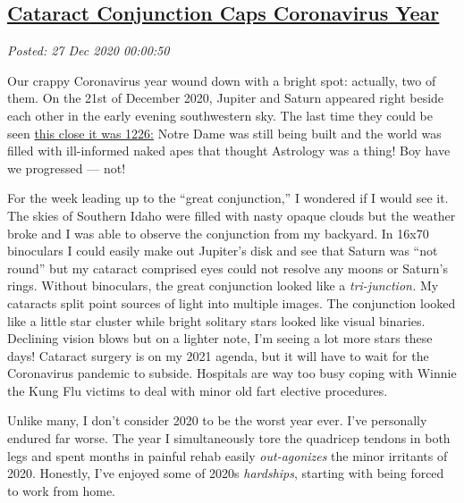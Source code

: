 %

\subsection*{\href{http://analyzethedatanotthedrivel.org/2020/12/26/cataract-conjunction-caps-coronavirus-year/}{Cataract Conjunction Caps Coronavirus Year}}


\noindent\emph{Posted: 27 Dec 2020 00:00:50}
\vspace{6pt}

Our crappy Coronavirus year wound down with a bright spot: actually, two
of them. On the 21st of December 2020, Jupiter and Saturn appeared right
beside each other in the early evening southwestern sky. The last time
they could be seen
\href{https://astronomy.com/news/2020/12/jupiter-and-saturn-will-form-rare-christmas-star-on-winter-solstice}{this
close it was 1226:} Notre Dame was still being built and the world was
filled with ill-informed naked apes that thought Astrology was a thing!
Boy have we progressed --- not!

For the week leading up to the ``great conjunction,'' I wondered if I
would see it. The skies of Southern Idaho were filled with nasty opaque
clouds but the weather broke and I was able to observe the conjunction
from my backyard. In 16x70 binoculars I could easily make out Jupiter's
disk and see that Saturn was ``not round'' but my cataract
comprised eyes could not resolve any moons or Saturn's rings. Without
binoculars, the great conjunction looked like a \emph{tri-junction.} My
cataracts split point sources of light into multiple images. The
conjunction looked like a little star cluster while bright solitary
stars looked like visual binaries. Declining vision blows but on a
lighter note, I'm seeing a lot more stars these days! Cataract surgery
is on my 2021 agenda, but it will have to wait for the Coronavirus
pandemic to subside. Hospitals are way too busy coping with Winnie the
Kung Flu victims to deal with minor old fart elective procedures.

Unlike many, I don't consider 2020 to be the worst year ever. I've
personally endured far worse. The year I simultaneously tore the
quadricep tendons in both legs and spent months in painful rehab easily
\emph{out-agonizes} the minor irritants of 2020. Honestly, I've enjoyed
some of 2020s \emph{hardships}, starting with being forced to work from
home.

